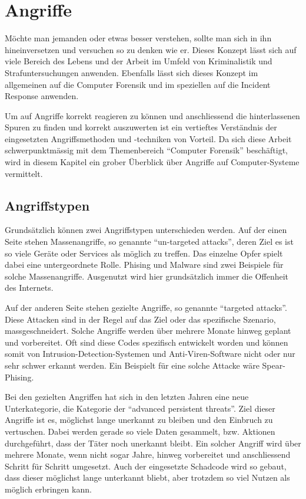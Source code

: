 \chapter{Angriffe} \label{chap:Attacks}

Möchte man jemanden oder etwas besser verstehen, sollte man sich in ihn hineinversetzen und versuchen so zu denken wie er. Dieses Konzept lässt sich auf viele Bereich des Lebens und der Arbeit im Umfeld von Kriminalistik und Strafuntersuchungen anwenden. Ebenfalls lässt sich dieses Konzept im allgemeinen auf die Computer Forensik und im speziellen auf die Incident Response anwenden.

Um auf Angriffe korrekt reagieren zu können und anschliessend die hinterlassenen Spuren zu finden und korrekt auszuwerten ist ein vertieftes Verständnis der eingesetzten Angriffsmethoden und -techniken von Vorteil. Da sich diese Arbeit schwerpunktmässig mit dem Themenbereich "`Computer Forensik"' beschäftigt, wird in diesem Kapitel ein grober Überblick über Angriffe auf Computer-Systeme vermittelt.

\section{Angriffstypen}
Grundsätzlich können zwei Angriffstypen unterschieden werden. Auf der einen Seite stehen Massenangriffe, so genannte "`un-targeted attacks"', deren Ziel es ist so viele Geräte oder Services als möglich zu treffen. Das einzelne Opfer spielt dabei eine untergeordnete Rolle. Phising und Malware sind zwei Beispiele für solche Massenangriffe. Ausgenutzt wird hier grundsätzlich immer die Offenheit des Internets.

Auf der anderen Seite stehen gezielte Angriffe, so genannte "`targeted attacks"'. Diese Attacken sind in der Regel auf das Ziel oder das spezifische Szenario, massgeschneidert. Solche Angriffe werden über mehrere Monate hinweg geplant und vorbereitet. Oft sind diese Codes spezifisch entwickelt worden und können somit von Intrusion-Detection-Systemen und Anti-Viren-Software nicht oder nur sehr schwer erkannt werden. Ein Beispielt für eine solche Attacke wäre Spear-Phising.

Bei den gezielten Angriffen hat sich in den letzten Jahren eine neue Unterkategorie, die Kategorie der "`advanced persistent threats"'. Ziel dieser Angriffe ist es, möglichst lange unerkannt zu bleiben und den Einbruch zu vertuschen. Dabei werden gerade so viele Daten gesammelt, bzw. Aktionen durchgeführt, dass der Täter noch unerkannt bleibt. Ein solcher Angriff wird über mehrere Monate, wenn nicht sogar Jahre, hinweg vorbereitet und anschliessend Schritt für Schritt umgesetzt. Auch der eingesetzte Schadcode wird so gebaut, dass dieser möglichst lange unterkannt bliebt, aber trotzdem so viel Nutzen als möglich erbringen kann.


